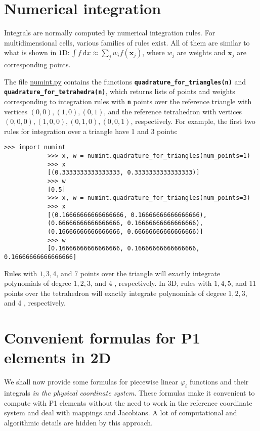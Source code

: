 \documentclass[../main.tex]{subfiles}
\begin{document}
	\section[Numerical integration]{Numerical integration}
		\label{sec:sec_17_2}
		\noindent Integrals are normally computed by numerical integration rules. For multidimensional cells, various families of rules exist. All of them are similar to what is shown in $1 \mathrm{D}: \int f \mathrm{~d} x \approx \sum_{j} w_{i} f\left(\boldsymbol{x}_{j}\right)$, where $w_{j}$ are weights and $\boldsymbol{x}_{j}$ are corresponding points.
		
		The file \href{https://github.com/hplgit/INF5620/blob/master/src/fem/numint.py}{numint.py} contains the functions \textbf{\texttt{quadrature\_for\_triangles(n)}} and \textbf{\texttt{quadrature\_for\_tetrahedra(n)}}, which returns lists of points and weights corresponding to integration rules with \textbf{\texttt{n}} points over the reference triangle with vertices $(0,0),(1,0),(0,1)$, and the reference tetrahedron with vertices $(0,0,0),(1,0,0),(0,1,0),(0,0,1)$, respectively. For example, the first two rules for integration over a triangle have 1 and 3 points:
		
		\begin{lstlisting}[numbers=none]
			>>> import numint
			>>> x, w = numint.quadrature_for_triangles(num_points=1)
			>>> x
			[(0.3333333333333333, 0.3333333333333333)]
			>>> w
			[0.5]
			>>> x, w = numint.quadrature_for_triangles(num_points=3)
			>>> x
			[(0.16666666666666666, 0.16666666666666666),
			(0.66666666666666666, 0.16666666666666666),
			(0.16666666666666666, 0.66666666666666666)]
			>>> w
			[0.16666666666666666, 0.16666666666666666, 0.16666666666666666]
		\end{lstlisting}
		Rules with $1,3,4$, and 7 points over the triangle will exactly integrate polynomials of degree $1,2,3$, and 4 , respectively. In $3 \mathrm{D}$, rules with $1,4,5$, and 11 points over the tetrahedron will exactly integrate polynomials of degree $1,2,3$, and 4 , respectively. \bigbreak
		
	\section[Convenient formulas for P1 elements in 2D]{Convenient formulas for P1 elements in 2D}
	\label{sec:sec_17_3}
	\noindent We shall now provide some formulas for piecewise linear $\varphi_{i}$ functions and their integrals \emph{in the physical coordinate system}. These formulas make it convenient to compute with P1 elements without the need to work in the reference coordinate system and deal with mappings and Jacobians. A lot of computational and algorithmic details are hidden by this approach.
	
\end{document}

